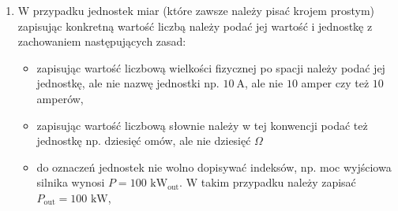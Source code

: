 \documentclass[12pt,twoside,openright]{article}
\begin{document}
\begin{enumerate}[label=\arabic*), leftmargin=1.25cm]
\begin{itemize}[label={--},labelsep=0.4cm,leftmargin=0.6cm]
\item wszystkie cyfry,

\item symbole konkretnych funkcji np. $\mathrm{tg\ } \omega t$, a nie $tg \omega t$,

\item operatory operacji matematycznych np. pochodne zwyczajne $\frac{\mathrm{d} x}{\mathrm{d} t}$, a nie $\frac{d x}{d t}$,

\item symbole liczb o konkretnej wartości np. przenikalność elektryczna próżni $\varepsilon_0 = 8,8542 \cdot 10^{-12}$ $\mathrm{F} \cdot \mathrm{m}^{-1}$, a nie $\varepsilon_0 = 8,8542 \cdot 10^{-12}$ $\mathrm{F} \cdot \mathrm{m}^{-1}$,

\item indeksy, jeżeli odnoszą się do: obiektów (fizycznych, geometrycznych), czyli, np. natężenie pola elektrycznego w punkcie A to $E_\mathrm{A}$, a nie $E_A$, zjawisk lub stanów fizycznych, np. moment obciążenia to $T_\mathrm{L}$, a nie $T_L$, do nazwisk czy też oznaczeń pierwiastków, np. straty w miedzi to $P_{\mathrm{Cu}}$ a nie $P_{Cu}$, do charakteru wielkości symbolizowanej przez literę źródłową, np. wartość maksymalna siły to $F_\mathrm{max}$, a nie $F_{max}$, oznaczeń jednostek miary np. $\mathrm{M}\Omega$, a nie $M \mathit{\Omega}$.

\end{itemize}

\item W przypadku jednostek miar (które zawsze należy pisać krojem prostym) zapisując konkretną wartość liczbą należy podać jej wartość i jednostkę z zachowaniem następujących zasad:

\begin{itemize}[label={--},labelsep=0.4cm,leftmargin=0.6cm]
\item zapisując wartość liczbową wielkości fizycznej po spacji należy podać jej jednostkę, ale nie nazwę jednostki np. $10~\mathrm{A}$, ale nie $10$ amper czy też $10$ amperów,

\item zapisując wartość liczbową słownie należy w tej konwencji podać też jednostkę np. dziesięć omów, ale nie dziesięć $\Omega$

\item do oznaczeń jednostek nie wolno dopisywać indeksów, np. moc wyjściowa silnika wynosi $P=100$ $\mathrm{kW}_\mathrm{out}$. W takim przypadku należy zapisać $P_\mathrm{out}=100$ $\mathrm{kW}$,


\end{itemize}
\end{enumerate}
\end{document}
